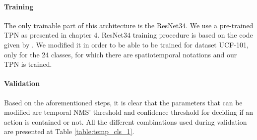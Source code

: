 \documentclass{report}
\begin{document}
\paragraph{Training} The only trainable part of this architecture is the ResNet34. We use a pre-trained TPN as presented in chapter 4.
ResNet34 training procedure is based on the code given by \cite{hara3dcnns}. We modified it in order to be able to be trained for dataset
UCF-101, only for the 24 classes, for which there are spatiotemporal notations and our TPN is trained. 

\paragraph{Validation}
Based on the aforementioned steps, it is clear that the parameters that can be modified are temporal NMS' threshold and confidence
threshold for deciding if an action is contained or not. All the different combinations used during validation are presented at Table
\ref{table:temp_cls_1}.
  
\end{document}
